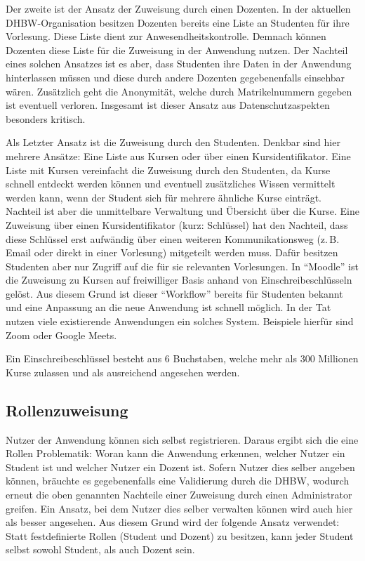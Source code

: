 Der zweite ist der Ansatz der Zuweisung durch einen Dozenten.
In der aktuellen DHBW-Organisation besitzen Dozenten bereits eine Liste an Studenten für ihre Vorlesung.
Diese Liste dient zur Anwesendheitskontrolle.
Demnach können Dozenten diese Liste für die Zuweisung in der Anwendung nutzen.
Der Nachteil eines solchen Ansatzes ist es aber, dass Studenten ihre Daten in der Anwendung hinterlassen müssen und diese durch andere Dozenten gegebenenfalls einsehbar wären.
Zusätzlich geht die Anonymität, welche durch Matrikelnummern gegeben ist eventuell verloren.
Insgesamt ist dieser Ansatz aus Datenschutzaspekten besonders kritisch. %

Als Letzter Ansatz ist die Zuweisung durch den Studenten.
Denkbar sind hier mehrere Ansätze: Eine Liste aus Kursen oder über einen Kursidentifikator.
Eine Liste mit Kursen vereinfacht die Zuweisung durch den Studenten, da Kurse schnell entdeckt werden können und eventuell zusätzliches Wissen vermittelt werden kann, wenn der Student sich für mehrere ähnliche Kurse einträgt.
Nachteil ist aber die unmittelbare Verwaltung und Übersicht über die Kurse.
Eine Zuweisung über einen Kursidentifikator (kurz: Schlüssel) hat den Nachteil, dass diese Schlüssel erst aufwändig über einen weiteren Kommunikationsweg (z.\,B. Email oder direkt in einer Vorlesung) mitgeteilt werden muss.
Dafür besitzen Studenten aber nur Zugriff auf die für sie relevanten Vorlesungen.
In \enquote{Moodle} ist die Zuweisung zu Kursen auf freiwilliger Basis anhand von Einschreibeschlüsseln gelöst.
Aus diesem Grund ist dieser \enquote{Workflow} bereits für Studenten bekannt und eine Anpassung an die neue Anwendung ist schnell möglich.
In der Tat nutzen viele existierende Anwendungen ein solches System.
Beispiele hierfür sind Zoom oder Google Meets.

Ein Einschreibeschlüssel besteht aus 6 Buchstaben, welche mehr als 300 Millionen Kurse zulassen und als ausreichend angesehen werden.


\subsection{Rollenzuweisung} %
Nutzer der Anwendung können sich selbst registrieren.
Daraus ergibt sich die eine Rollen Problematik: Woran kann die Anwendung erkennen, welcher Nutzer ein Student ist und welcher Nutzer ein Dozent ist.
Sofern Nutzer dies selber angeben können, bräuchte es gegebenenfalls eine Validierung durch die DHBW, wodurch erneut die oben genannten Nachteile einer Zuweisung durch einen Administrator greifen.
Ein Ansatz, bei dem Nutzer dies selber verwalten können wird auch hier als besser angesehen.
Aus diesem Grund wird der folgende Ansatz verwendet:
Statt festdefinierte Rollen (Student und Dozent) zu besitzen, kann jeder Student selbst sowohl Student, als auch Dozent sein.

